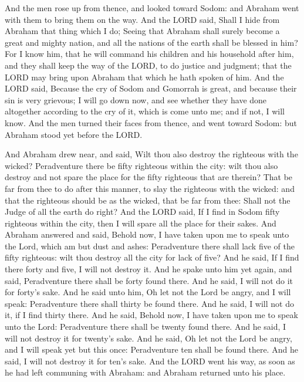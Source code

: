  And the men rose up from thence, and looked toward
Sodom: and Abraham went with them to bring them on the way.
 And the LORD said, Shall I hide from Abraham that thing
which I do;  Seeing that Abraham shall surely become a
great and mighty nation, and all the nations of the earth shall be
blessed in him?  For I know him, that he will command his
children and his household after him, and they shall keep the way of the
LORD, to do justice and judgment; that the LORD may bring upon Abraham
that which he hath spoken of him.  And the LORD said,
Because the cry of Sodom and Gomorrah is great, and because their sin is
very grievous;  I will go down now, and see whether they
have done altogether according to the cry of it, which is come unto me;
and if not, I will know.  And the men turned their faces
from thence, and went toward Sodom: but Abraham stood yet before the
LORD.

 And Abraham drew near, and said, Wilt thou also destroy
the righteous with the wicked?  Peradventure there be fifty
righteous within the city: wilt thou also destroy and not spare the
place for the fifty righteous that are therein?  That be
far from thee to do after this manner, to slay the righteous with the
wicked: and that the righteous should be as the wicked, that be far from
thee: Shall not the Judge of all the earth do right?  And
the LORD said, If I find in Sodom fifty righteous within the city, then
I will spare all the place for their sakes.  And Abraham
answered and said, Behold now, I have taken upon me to speak unto the
Lord, which am but dust and ashes:  Peradventure there
shall lack five of the fifty righteous: wilt thou destroy all the city
for lack of five? And he said, If I find there forty and five, I will
not destroy it.  And he spake unto him yet again, and said,
Peradventure there shall be forty found there. And he said, I will not
do it for forty's sake.  And he said unto him, Oh let not
the Lord be angry, and I will speak: Peradventure there shall thirty be
found there. And he said, I will not do it, if I find thirty there.
 And he said, Behold now, I have taken upon me to speak
unto the Lord: Peradventure there shall be twenty found there. And he
said, I will not destroy it for twenty's sake.  And he
said, Oh let not the Lord be angry, and I will speak yet but this once:
Peradventure ten shall be found there. And he said, I will not destroy
it for ten's sake.  And the LORD went his way, as soon as
he had left communing with Abraham: and Abraham returned unto his place.

